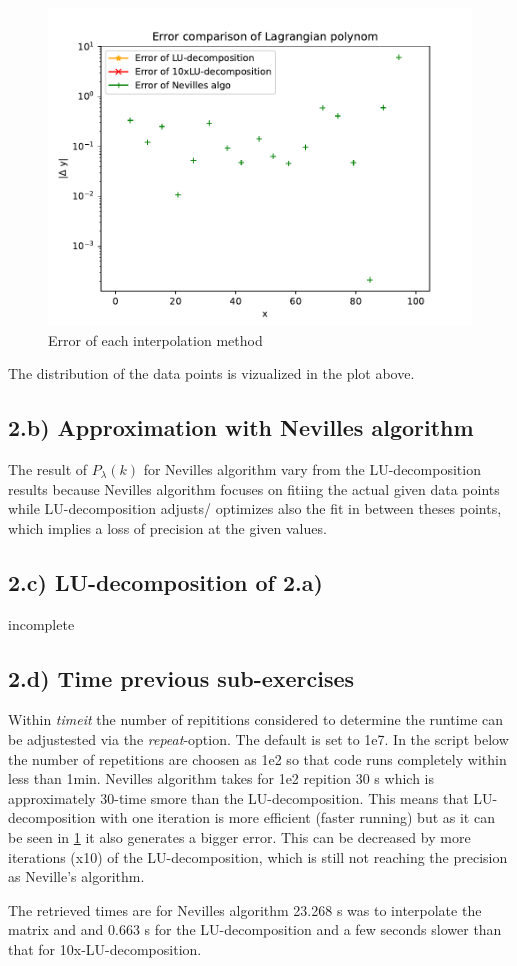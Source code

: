 \begin{figure}
    \centering
    \includegraphics{./plots/2_interpolation_error.pdf}
    \caption{Error of each interpolation method}
    \label{fig:error}
\end{figure}

The distribution of the data points is vizualized in the plot above.

\subsection{2.b) Approximation with Nevilles algorithm}

The result of $P_{\lambda}(k)$ for Nevilles algorithm vary from the LU-decomposition results because Nevilles algorithm focuses on fitiing the actual given data points while LU-decomposition adjusts/ optimizes also the fit in between theses points, which implies a loss of precision at the given values.

\subsection{2.c) LU-decomposition of 2.a)}

incomplete

\subsection{2.d) Time previous sub-exercises}

Within \textit{timeit} the number of repititions considered to determine the runtime can be adjustested via the \textit{repeat}-option. The default is set to 1e7. In the script below the number of repetitions are choosen as 1e2 so that code runs completely within less than 1min. Nevilles algorithm takes for 1e2 repition 30 s which is approximately 30-time smore than the LU-decomposition. This means that LU-decomposition with one iteration is more efficient (faster running) but as it can be seen in \ref{fig:error} it also generates a bigger error. This can be decreased by more iterations (x10) of the LU-decomposition, which is still not reaching the precision as Neville's algorithm.



The retrieved times are for Nevilles algorithm 23.268 s was to interpolate the matrix and and 0.663 s for the LU-decomposition and a few seconds slower than that for 10x-LU-decomposition.
